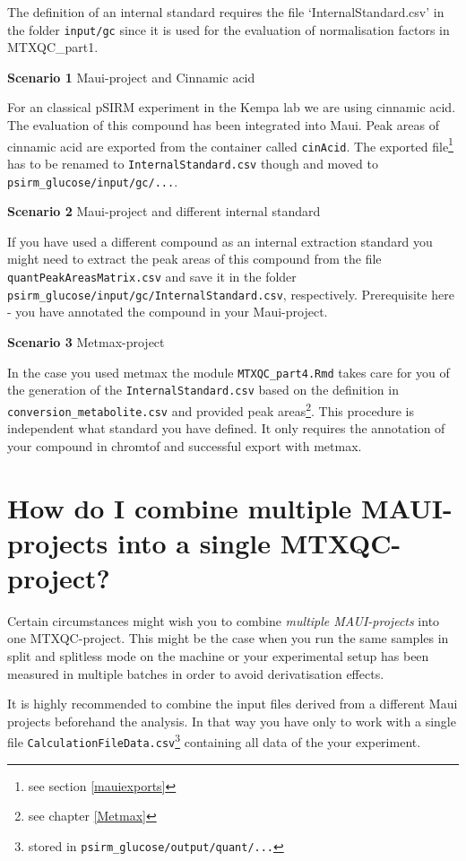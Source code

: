 \documentclass[]{book}
\let\rmarkdownfootnote\footnote%
\def\footnote{\protect\rmarkdownfootnote}
\theoremstyle{definition}
\theoremstyle{definition}
\theoremstyle{definition}
\theoremstyle{remark}
\begin{document}
The definition of an internal standard requires the file
`InternalStandard.csv' in the folder \texttt{input/gc} since it is used
for the evaluation of normalisation factors in MTXQC\_part1.

\textbf{Scenario 1} Maui-project and Cinnamic acid

For an classical pSIRM experiment in the Kempa lab we are using cinnamic
acid. The evaluation of this compound has been integrated into Maui.
Peak areas of cinnamic acid are exported from the container called
\texttt{cinAcid}. The exported file\footnote{see section
  \ref{mauiexports}} has to be renamed to \texttt{InternalStandard.csv}
though and moved to \texttt{psirm\_glucose/input/gc/...}.

\textbf{Scenario 2} Maui-project and different internal standard

If you have used a different compound as an internal extraction standard
you might need to extract the peak areas of this compound from the file
\texttt{quantPeakAreasMatrix.csv} and save it in the folder
\texttt{psirm\_glucose/input/gc/InternalStandard.csv}, respectively.
Prerequisite here - you have annotated the compound in your
Maui-project.

\textbf{Scenario 3} Metmax-project

In the case you used metmax the module \texttt{MTXQC\_part4.Rmd} takes
care for you of the generation of the \texttt{InternalStandard.csv}
based on the definition in \texttt{conversion\_metabolite.csv} and
provided peak areas\footnote{see chapter \ref{Metmax}}. This procedure
is independent what standard you have defined. It only requires the
annotation of your compound in chromtof and successful export with
metmax.

\section{How do I combine multiple MAUI-projects into a single
MTXQC-project?}\label{multipleproj}

Certain circumstances might wish you to combine \emph{multiple
MAUI-projects} into one MTXQC-project. This might be the case when you
run the same samples in split and splitless mode on the machine or your
experimental setup has been measured in multiple batches in order to
avoid derivatisation effects.

It is highly recommended to combine the input files derived from a
different Maui projects beforehand the analysis. In that way you have
only to work with a single file
\texttt{CalculationFileData.csv}\footnote{stored in
  \texttt{psirm\_glucose/output/quant/...}} containing all data of the
your experiment.
\end{document}
